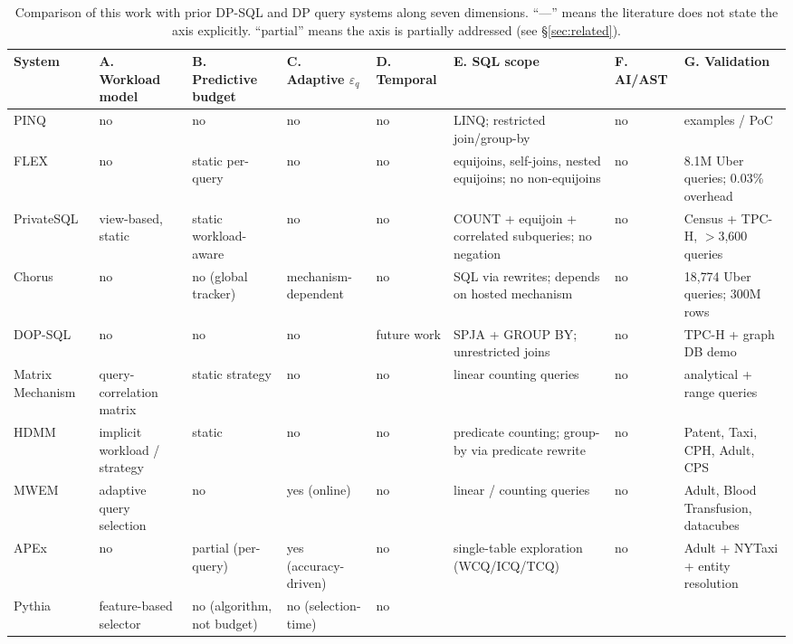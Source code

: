 \documentclass[sigconf,nonacm]{acmart}
\newcommand{\eps}{\varepsilon}
\begin{document}
\begin{table}[t]
\caption{Comparison of this work with prior DP-SQL and DP query systems along seven dimensions. ``---'' means the literature does not state the axis explicitly. ``partial'' means the axis is partially addressed (see §\ref{sec:related}).}
\label{tab:related-comparison}
\centering
\scriptsize
\renewcommand{\arraystretch}{1.1}
\begin{tabular}{p{2.5cm}|p{2.2cm}|p{1.8cm}|p{1.9cm}|p{1.4cm}|p{2.7cm}|p{1.0cm}|p{2.0cm}}
\toprule
System & A. Workload model & B. Predictive budget & C. Adaptive $\eps_q$ & D. Temporal & E. SQL scope & F. AI/AST & G. Validation \\
\midrule
PINQ \cite{mcsherry2009privacy}
  & no & no & no & no
  & LINQ; restricted join/group-by
  & no & examples / PoC \\
FLEX \cite{johnson2018towards}
  & no & static per-query & no & no
  & equijoins, self-joins, nested equijoins; no non-equijoins
  & no & 8.1M Uber queries; 0.03\% overhead \\
PrivateSQL \cite{kotsogiannis2019privatesql}
  & view-based, static & static workload-aware & no & no
  & COUNT + equijoin + correlated subqueries; no negation
  & no & Census + TPC-H, $>$3{,}600 queries \\
Chorus \cite{johnson2020chorus}
  & no & no (global tracker) & mechanism-dependent & no
  & SQL via rewrites; depends on hosted mechanism
  & no & 18{,}774 Uber queries; 300M rows \\
DOP-SQL \cite{yu2024dopsql}
  & no & no & no & future work
  & SPJA + GROUP BY; unrestricted joins
  & no & TPC-H + graph DB demo \\
\midrule
Matrix Mechanism \cite{li2010mm}
  & query-correlation matrix & static strategy & no & no
  & linear counting queries
  & no & analytical + range queries \\
HDMM \cite{mckenna2018hdmm}
  & implicit workload / strategy & static & no & no
  & predicate counting; group-by via predicate rewrite
  & no & Patent, Taxi, CPH, Adult, CPS \\
MWEM \cite{hardtligett2012mwem}
  & adaptive query selection & no & yes (online) & no
  & linear / counting queries
  & no & Adult, Blood Transfusion, datacubes \\
APEx \cite{ge2019apex}
  & no & partial (per-query) & yes (accuracy-driven) & no
  & single-table exploration (WCQ/ICQ/TCQ)
  & no & Adult + NYTaxi + entity resolution \\
Pythia \cite{kotsogiannis2017pythia}
  & feature-based selector & no (algorithm, not budget) & no (selection-time) & no

\end{tabular}
\end{table}
\end{document}
